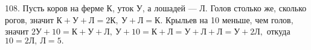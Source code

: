 108. Пусть коров на ферме К, уток У, а лошадей --- Л. Голов столько же, сколько рогов, значит $\text{К}+\text{У}+\text{Л}=2\text{К},\ \text{У}+\text{Л}=\text{К}.$ Крыльев на 10 меньше, чем голов, значит $2\text{У}+10=\text{К}+\text{У}+\text{Л},\ \text{У}+10=\text{К}+\text{Л}=\text{У}+\text{Л}+\text{Л}=\text{У}+2\text{Л},$ откуда $10=2\text{Л},\ \text{Л}=5.$\\

